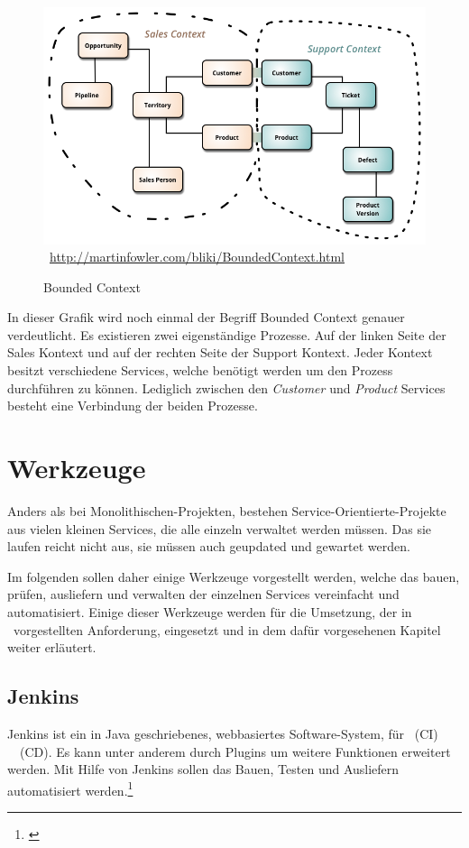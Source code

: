 \begin{figure}[htb]
    \centering 
    \includegraphics[width=\linewidth]{content/images/BoundedContext}\
    \quelle\url{http://martinfowler.com/bliki/BoundedContext.html}
    \caption[Bounded Context]{Bounded Context\\}
    \label{fig:BoundedContext}  
\end{figure}\noindent  
In dieser Grafik wird noch einmal der Begriff Bounded Context genauer verdeutlicht. Es existieren zwei eigenständige Prozesse. Auf der linken Seite der Sales Kontext und auf der rechten Seite der Support Kontext. Jeder Kontext besitzt verschiedene Services, welche benötigt werden um den Prozess durchführen zu können. Lediglich zwischen den \textit{Customer} und \textit{Product} Services besteht eine Verbindung der beiden Prozesse.

\section{Werkzeuge}
\label{sec:werkzeuge}
Anders als bei Monolithischen-Projekten, bestehen Service-Orientierte-Projekte aus vielen kleinen Services, die alle einzeln verwaltet werden müssen. Das sie laufen reicht nicht aus, sie müssen auch geupdated und gewartet werden.

Im folgenden sollen daher einige Werkzeuge vorgestellt werden, welche das bauen, prüfen, ausliefern und verwalten der einzelnen Services vereinfacht und automatisiert. Einige dieser Werkzeuge werden für die Umsetzung, der in \ vorgestellten Anforderung, eingesetzt und in dem dafür vorgesehenen Kapitel weiter erläutert.

\subsection{Jenkins}
\label{subsec:jenkins}
Jenkins ist ein in Java geschriebenes, webbasiertes Software-System, für \ci\ (CI) \ \cd\ (CD). Es kann unter anderem durch Plugins um weitere Funktionen erweitert werden. Mit Hilfe von Jenkins sollen das Bauen, Testen und Ausliefern automatisiert werden.\footnote{\cite[vgl. S. 98 ff.]{EWolff2015:ContinuouosDelivery}}

